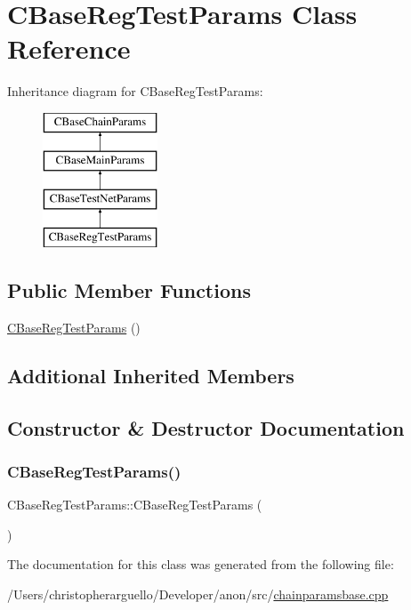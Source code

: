 \hypertarget{class_c_base_reg_test_params}{}\section{C\+Base\+Reg\+Test\+Params Class Reference}
\label{class_c_base_reg_test_params}
Inheritance diagram for C\+Base\+Reg\+Test\+Params\+:\begin{figure}[H]
\begin{center}
\leavevmode
\includegraphics[height=4.000000cm]{class_c_base_reg_test_params}
\end{center}
\end{figure}
\subsection*{Public Member Functions}
\begin{DoxyCompactItemize}
\item 
\mbox{\hyperlink{class_c_base_reg_test_params_af32910af3003663d0ea5ee6406ce3b50}{C\+Base\+Reg\+Test\+Params}} ()
\end{DoxyCompactItemize}
\subsection*{Additional Inherited Members}


\subsection{Constructor \& Destructor Documentation}
\mbox{\label{class_c_base_reg_test_params_af32910af3003663d0ea5ee6406ce3b50}} 
\subsubsection{\texorpdfstring{C\+Base\+Reg\+Test\+Params()}{CBaseRegTestParams()}}
{\footnotesize\ttfamily C\+Base\+Reg\+Test\+Params\+::\+C\+Base\+Reg\+Test\+Params (\begin{DoxyParamCaption}{ }\end{DoxyParamCaption})\hspace{0.3cm}{\ttfamily [inline]}}



The documentation for this class was generated from the following file\+:\begin{DoxyCompactItemize}
\item 
/\+Users/christopherarguello/\+Developer/anon/src/\mbox{\hyperlink{chainparamsbase_8cpp}{chainparamsbase.\+cpp}}\end{DoxyCompactItemize}
